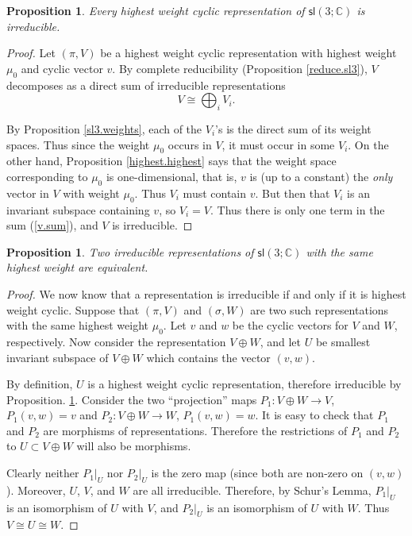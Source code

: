 \documentclass{amsbook}
\theoremstyle{plain}
\newtheorem{proposition}[theorem]{Proposition}
\numberwithin{equation}{chapter}
\numberwithin{theorem}{chapter}
\begin{document}
\begin{proposition}
\label{highest.irred}Every highest weight cyclic representation of
$\mathsf{sl}\left(  3;\mathbb{C}\right)  $ is irreducible.
\end{proposition}

\begin{proof}
Let $\left(  \pi,V\right)  $ be a highest weight cyclic representation with
highest weight $\mu_{0}$ and cyclic vector $v$. By complete reducibility
(Proposition \ref{reduce.sl3}), $V$ decomposes as a direct sum of irreducible
representations
\begin{equation}
V\cong\bigoplus_{i}V_{i}\text{.}\label{v.sum}%
\end{equation}

By Proposition \ref{sl3.weights}, each of the $V_{i}$'s is the direct sum of
its weight spaces. Thus since the weight $\mu_{0}$ occurs in $V$, it must
occur in some $V_{i}$. On the other hand, Proposition \ref{highest.highest}
says that the weight space corresponding to $\mu_{0}$ is one-dimensional, that
is, $v$ is (up to a constant) the \textit{only} vector in $V$ with weight
$\mu_{0}$. Thus $V_{i}$ must contain $v$. But then that $V_{i}$ is an
invariant subspace containing $v$, so $V_{i}=V$. Thus there is only one term
in the sum (\ref{v.sum}), and $V$ is irreducible.
\end{proof}

\begin{proposition}
Two irreducible representations of $\mathsf{sl}\left(  3;\mathbb{C}\right)  $
with the same highest weight are equivalent.
\end{proposition}

\begin{proof}
We now know that a representation is irreducible if and only if it is highest
weight cyclic. Suppose that $\left(  \pi,V\right)  $ and $\left(
\sigma,W\right)  $ are two such representations with the same highest weight
$\mu_{0}$. Let $v$ and $w$ be the cyclic vectors for $V$ and $W$,
respectively. Now consider the representation $V\oplus W$, and let $U$ be
smallest invariant subspace of $V\oplus W$ which contains the vector $(v,w)$.

By definition, $U$ is a highest weight cyclic representation, therefore
irreducible by Proposition. \ref{highest.irred}. Consider the two
``projection'' maps $P_{1}:V\oplus W\rightarrow V$, $P_{1}(v,w)=v$ and
$P_{2}:V\oplus W\rightarrow W$, $P_{1}(v,w)=w$. It is easy to check that
$P_{1}$ and $P_{2}$ are morphisms of representations. Therefore the
restrictions of $P_{1}$ and $P_{2}$ to $U\subset V\oplus W$ will also be morphisms.

Clearly neither $\left.  P_{1}\right|  _{U}$ nor $\left.  P_{2}\right|  _{U}$
is the zero map (since both are non-zero on $\left(  v,w\right)  $). Moreover,
$U$, $V$, and $W$ are all irreducible. Therefore, by Schur's Lemma, $\left.
P_{1}\right|  _{U}$ is an isomorphism of $U$ with $V$, and $\left.
P_{2}\right|  _{U}$ is an isomorphism of $U$ with $W$. Thus $V\cong U\cong W$.
\end{proof}
\end{document}
